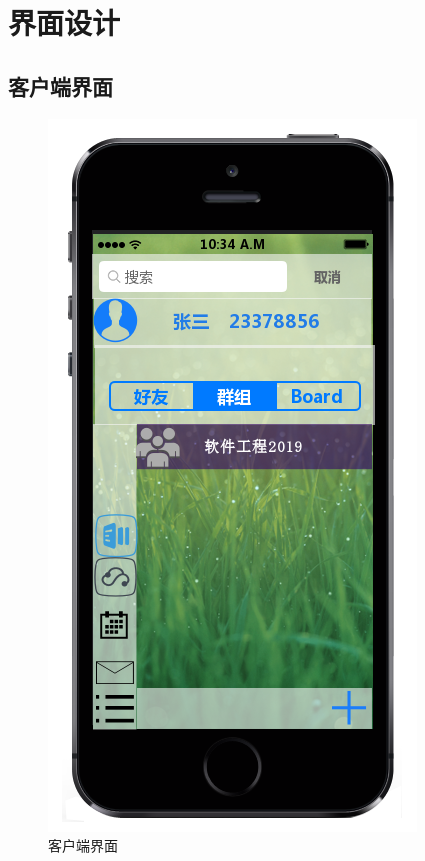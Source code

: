 \chapter{界面设计}
    \section{客户端界面}
    \begin{figure}[h]
        \centering
        \includegraphics[scale=0.6]{OutlineDesign/figures/客户端界面.png}
        \caption{客户端界面}
        \label{fig:server_flow}
    \end{figure}
    \newpage
